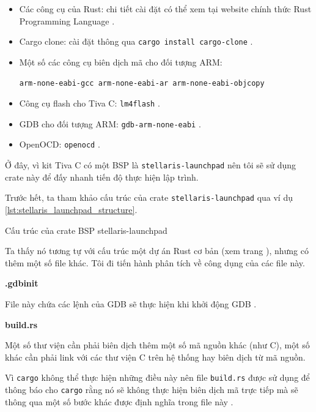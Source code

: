 \begin{itemize}
    \item Các công cụ của Rust: chi tiết cài đặt có thể xem tại website chính thức Rust Programming Language \cite{rust_website}.
    \item Cargo clone: cài đặt thông qua \texttt{cargo install cargo-clone} \cite{cargo_clone}.
    \item Một số các công cụ biên dịch mã cho đối tượng ARM:

    \texttt{arm-none-eabi-gcc arm-none-eabi-ar arm-none-eabi-objcopy}
    \item Công cụ flash cho Tiva C: \texttt{lm4flash} \cite{lm4tools}.
    \item GDB cho đối tượng ARM: \texttt{gdb-arm-none-eabi} \cite{gdb_website}.
    \item OpenOCD: \texttt{openocd} \cite{openocd_website}.
\end{itemize}

Ở đây, vì kit Tiva C có một BSP là \texttt{stellaris-launchpad} \cite{stellaris_launchpad_bsp} nên tôi sẽ sử dụng crate này để đấy nhanh tiến độ thực hiện lập trình. \label{lbl:tivac_bsp}

Trước hết, ta tham khảo cấu trúc của crate \texttt{stellaris-launchpad} qua ví dụ \ref{lst:stellaris_launchpad_structure}.

\begin{listing}
\caption{Cấu trúc của crate BSP stellaris-launchpad}
\label{lst:stellaris_launchpad_structure}
\end{listing}

Ta thấy nó tương tự với cấu trúc một dự án Rust cơ bản (xem trang \pageref{lbl:basic_rust_proj_structure}), nhưng có thêm một số file khác.
Tôi đi tiến hành phân tích về công dụng của các file này.

\textbf{.gdbinit}

File này chứa các lệnh của GDB sẽ thực hiện khi khởi động GDB \cite{gdbinit}.

\textbf{build.rs}

Một số thư viện cần phải biên dịch thêm một số mã nguồn khác (như C), một số khác cần phải link với các thư viện C trên hệ thống hay biên dịch từ mã nguồn.

Vì \texttt{cargo} không thể thực hiện những điều này nên file \texttt{build.rs} được sử dụng để thông báo cho \texttt{cargo} rằng nó sẽ không thực hiện biên dịch mã trực tiếp mà sẽ thông qua một số bước khác được định nghĩa trong file này \cite{cargo_book}.

